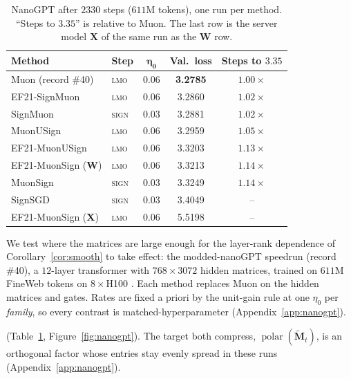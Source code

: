 \begin{table}[!tb]
\centering\small
\setlength{\tabcolsep}{4pt}
\begin{tabular}{@{}llccc@{}}
\toprule
\textbf{Method} & \textbf{Step} & $\boldsymbol{\eta_0}$ & \textbf{Val.\ loss} & \textbf{Steps to $3.35$} \\
\midrule
Muon (record \#40)   & \textsc{lmo}  & 0.06 & \textbf{3.2785} & $1.00\times$ \\
EF21-SignMuon        & \textsc{lmo}  & 0.06 & 3.2860 & $1.02\times$ \\
SignMuon             & \textsc{sign} & 0.03 & 3.2881 & $1.02\times$ \\
MuonUSign            & \textsc{lmo}  & 0.06 & 3.2959 & $1.05\times$ \\
EF21-MuonUSign       & \textsc{lmo}  & 0.06 & 3.3203 & $1.13\times$ \\
EF21-MuonSign ($\mathbf{W}$) & \textsc{lmo} & 0.06 & 3.3213 & $1.14\times$ \\
MuonSign             & \textsc{sign} & 0.03 & 3.3249 & $1.14\times$ \\
SignSGD              & \textsc{sign} & 0.03 & 3.4049 & -- \\
\midrule
EF21-MuonSign ($\mathbf{X}$) & \textsc{lmo} & 0.06 & 5.5198 & -- \\
\bottomrule
\end{tabular}
\caption{NanoGPT after $2330$ steps ($611$M tokens), one run per method. ``Steps to $3.35$'' is relative to Muon. The last row is the server model $\mathbf{X}$ of the same run as the $\mathbf{W}$ row.}
\label{tab:nanogpt}
\end{table}

We test where the matrices are large enough for the layer-rank dependence of Corollary~\ref{cor:smooth} to take effect: the modded-nanoGPT speedrun (record \#40), a $12$-layer transformer with $768\times3072$ hidden matrices, trained on $611$M FineWeb tokens on $8\times$H100 \citep{jordan2024moddednanogpt}. Each method replaces Muon on the hidden matrices and gates. Rates are fixed a priori by the unit-gain rule at one $\eta_0$ per \emph{family}, so every contrast is matched-hyperparameter (Appendix~\ref{app:nanogpt}).

 (Table~\ref{tab:nanogpt}, Figure~\ref{fig:nanogpt}).  The target both compress, $\operatorname{polar}(\tilde{\mathbf{M}}_t)$, is an orthogonal factor whose entries stay evenly spread in these runs (Appendix~\ref{app:nanogpt}).

